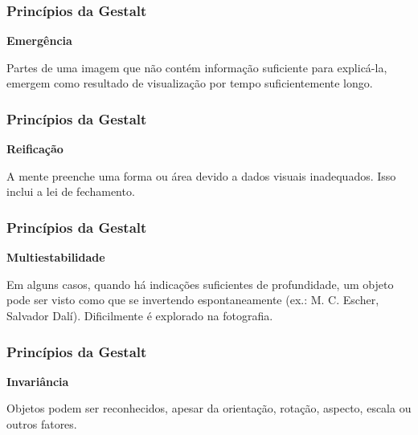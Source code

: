 \begin{frame}
    \frametitle{Princípios da Gestalt}
    {\textbf{\large Emergência}}
    \vspace{1cm}

    Partes de uma imagem que não contém informação suficiente para explicá-la,
    emergem como resultado de visualização por tempo suficientemente longo.
\end{frame}

\begin{frame}
  \frametitle{Princípios da Gestalt}
  {\textbf{\large Reificação}}
  \vspace{1cm}

  A mente preenche uma forma ou área devido a dados visuais inadequados. Isso
  inclui a lei de fechamento.
\end{frame}

\begin{frame}
  \frametitle{Princípios da Gestalt}
  {\textbf{\large Multiestabilidade}}
  \vspace{1cm}

  Em alguns casos, quando há indicações suficientes de profundidade, um objeto
  pode ser visto como que se invertendo espontaneamente (ex.: M. C. Escher,
  Salvador Dalí). Dificilmente é explorado na fotografia.
\end{frame}

\begin{frame}
  \frametitle{Princípios da Gestalt}
  {\textbf{\large Invariância}}
  \vspace{1cm}

  Objetos podem ser reconhecidos, apesar da orientação, rotação, aspecto, escala
  ou outros fatores.
\end{frame}





